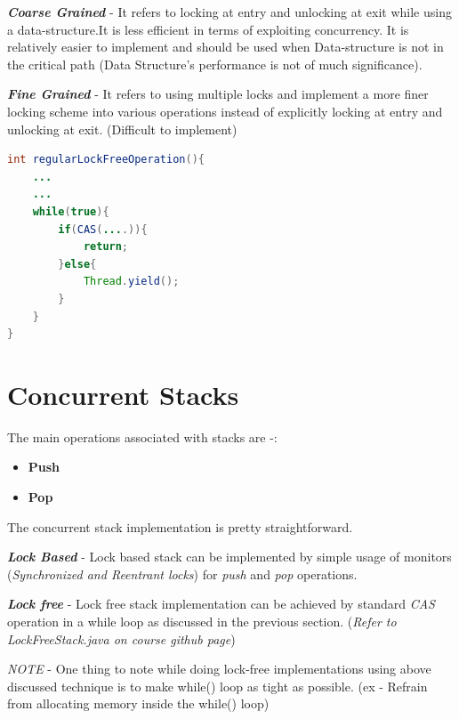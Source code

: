 \documentclass[twoside]{article}
\begin{document}
\textbf{\textit{Coarse Grained}} - It refers to locking at entry and unlocking at exit while using a data-structure.It is less efficient in terms of exploiting concurrency. It is relatively easier to implement and should be used when Data-structure is not in the critical path (Data Structure's performance is not of much significance).  

\textbf{\textit{Fine Grained}} - It refers to using multiple locks and implement a more finer locking scheme into various operations instead of explicitly locking at entry and unlocking at exit. (Difficult to implement)
\begin{center}
\renewcommand{\lstlistingname}{Code}
\begin{lstlisting}[language=Java, caption=Lock Free Implementation, frame=single, basicstyle=\Large]
int regularLockFreeOperation(){
    ...
    ...
    while(true){
        if(CAS(....)){
            return;
        }else{
            Thread.yield();
        }
    }    
}
\end{lstlisting}
\end{center}

\section{Concurrent Stacks}
The main operations associated with stacks are -:
\begin{itemize}
    \item \textbf{Push}
    \item \textbf{Pop}
\end{itemize}
The concurrent stack implementation is pretty straightforward.

\textbf{\textit{Lock Based}} - Lock based stack can be implemented by simple usage of monitors (\textit{Synchronized and Reentrant locks}) for \textit{push} and \textit{pop} operations.

\textbf{\textit{Lock free}} - Lock free stack implementation can be achieved by standard \textit{CAS} operation in a while loop as discussed in the previous section. (\textit{Refer to LockFreeStack.java on course github page})

\textit{NOTE} - One thing to note while doing lock-free implementations using above discussed technique is to make while() loop as tight as possible. (ex - Refrain from allocating memory inside the while() loop)
\end{document}
